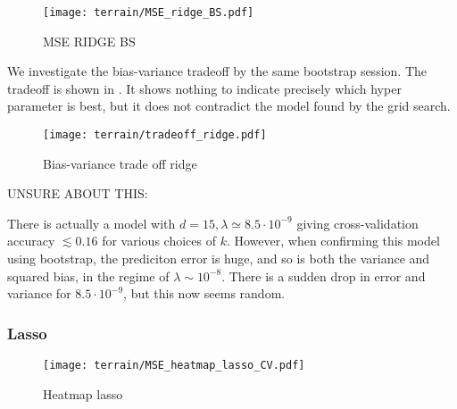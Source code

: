         \begin{figure}
            \texttt{[image: terrain/MSE\_ridge\_BS.pdf]}
            \caption{MSE RIDGE BS}
            \label{fig:gc_mse_ridge_bs}
        \end{figure}

        We investigate the bias-variance tradeoff by the same bootstrap session. The tradeoff is shown in . It shows nothing to indicate precisely which hyper parameter is best, but it does not contradict the model found by the grid search.

        \begin{figure}
            \texttt{[image: terrain/tradeoff\_ridge.pdf]}
            \caption{Bias-variance trade off ridge}
            \label{fig:gc_bias_variance_ridge}
        \end{figure}

        \par
        UNSURE ABOUT THIS:

        There is actually a model with $d=15, \lambda\simeq 8.5 \cdot 10^{-9}$ giving cross-validation accuracy $\lesssim 0.16$ for various choices of $k$. However, when confirming this model using bootstrap, the prediciton error is huge, and so is both the variance and squared bias, in the regime of $\lambda\sim 10^{-8}$. There is a sudden drop in error and variance for $8.5 \cdot 10^{-9}$, but this now seems random.


        \subsubsection{Lasso}\label{sec:gc_lassoanalysis}

        \begin{figure}
            \texttt{[image: terrain/MSE\_heatmap\_lasso\_CV.pdf]}
            \caption{Heatmap lasso}
            \label{fig:gc_gridseach_lasso}
        \end{figure}

      





    